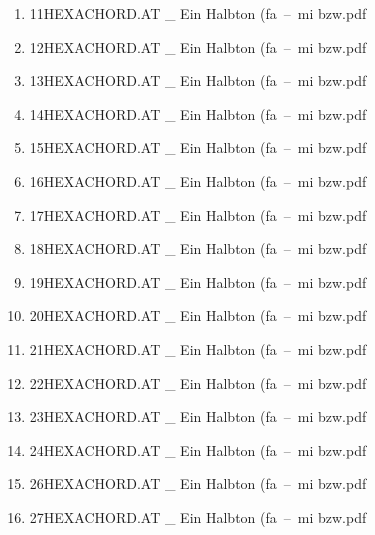 \documentclass[11pt]{article}
\begin{document}
\begin{enumerate}
\begin{enumerate}
\begin{enumerate}
\begin{enumerate}
\item 11HEXACHORD.AT \_ Ein Halbton (fa – mi bzw.pdf
\label{sec-1-1-1-1-31-7-2-8-1-12}

\item 12HEXACHORD.AT \_ Ein Halbton (fa – mi bzw.pdf
\label{sec-1-1-1-1-31-7-2-8-1-13}

\item 13HEXACHORD.AT \_ Ein Halbton (fa – mi bzw.pdf
\label{sec-1-1-1-1-31-7-2-8-1-14}

\item 14HEXACHORD.AT \_ Ein Halbton (fa – mi bzw.pdf
\label{sec-1-1-1-1-31-7-2-8-1-15}

\item 15HEXACHORD.AT \_ Ein Halbton (fa – mi bzw.pdf
\label{sec-1-1-1-1-31-7-2-8-1-16}

\item 16HEXACHORD.AT \_ Ein Halbton (fa – mi bzw.pdf
\label{sec-1-1-1-1-31-7-2-8-1-17}

\item 17HEXACHORD.AT \_ Ein Halbton (fa – mi bzw.pdf
\label{sec-1-1-1-1-31-7-2-8-1-18}

\item 18HEXACHORD.AT \_ Ein Halbton (fa – mi bzw.pdf
\label{sec-1-1-1-1-31-7-2-8-1-19}

\item 19HEXACHORD.AT \_ Ein Halbton (fa – mi bzw.pdf
\label{sec-1-1-1-1-31-7-2-8-1-20}

\item 20HEXACHORD.AT \_ Ein Halbton (fa – mi bzw.pdf
\label{sec-1-1-1-1-31-7-2-8-1-21}

\item 21HEXACHORD.AT \_ Ein Halbton (fa – mi bzw.pdf
\label{sec-1-1-1-1-31-7-2-8-1-22}

\item 22HEXACHORD.AT \_ Ein Halbton (fa – mi bzw.pdf
\label{sec-1-1-1-1-31-7-2-8-1-23}

\item 23HEXACHORD.AT \_ Ein Halbton (fa – mi bzw.pdf
\label{sec-1-1-1-1-31-7-2-8-1-24}

\item 24HEXACHORD.AT \_ Ein Halbton (fa – mi bzw.pdf
\label{sec-1-1-1-1-31-7-2-8-1-25}

\item 26HEXACHORD.AT \_ Ein Halbton (fa – mi bzw.pdf
\label{sec-1-1-1-1-31-7-2-8-1-26}

\item 27HEXACHORD.AT \_ Ein Halbton (fa – mi bzw.pdf
\label{sec-1-1-1-1-31-7-2-8-1-27}


\end{enumerate}
\end{enumerate}
\end{enumerate}
\end{enumerate}
\end{document}
